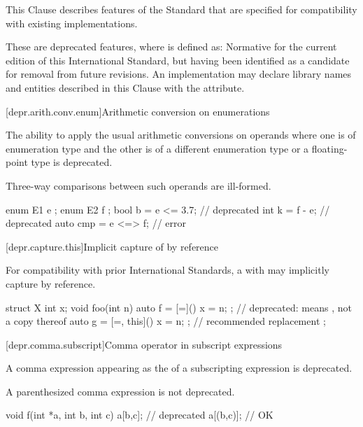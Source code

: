 
\pnum
This Clause describes features of the \Cpp{} Standard that are specified for compatibility with
existing implementations.

\pnum
These are deprecated features, where
is defined as:
Normative for the current edition of this International Standard,
but having been identified as a candidate for removal from future revisions.
An implementation may declare library names and entities described in this Clause with the
 attribute.

[depr.arith.conv.enum]{Arithmetic conversion on enumerations}

\pnum
The ability to apply the usual arithmetic conversions
on operands where one is of enumeration type
and the other is of a different enumeration type
or a floating-point type
is deprecated.
\begin{note}
Three-way comparisons between such operands are ill-formed.
\end{note}
\begin{example}
\begin{codeblock}
enum E1 { e };
enum E2 { f };
bool b = e <= 3.7;              // deprecated
int k = f - e;                  // deprecated
auto cmp = e <=> f;             // error
\end{codeblock}
\end{example}

[depr.capture.this]{Implicit capture of  by reference}

\pnum
For compatibility with prior \Cpp{} International Standards,
a  with 
\tcode{=} may implicitly capture
 by reference.
\begin{example}
\begin{codeblock}
struct X {
  int x;
  void foo(int n) {
    auto f = [=]() { x = n; };          // deprecated:  means , not a copy thereof
    auto g = [=, this]() { x = n; };    // recommended replacement
  }
};
\end{codeblock}
\end{example}

[depr.comma.subscript]{Comma operator in subscript expressions}

\pnum
A comma expression
appearing as the 
of a subscripting expression is deprecated.
\begin{note}
A parenthesized comma expression is not deprecated.
\end{note}
\begin{example}
\begin{codeblock}
void f(int *a, int b, int c) {
    a[b,c];                     // deprecated
    a[(b,c)];                   // OK
}
\end{codeblock}
\end{example}

